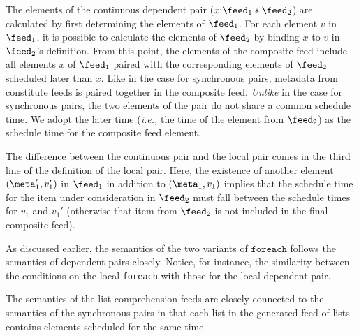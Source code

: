 The elements of the continuous dependent pair ($x{:}\feed_1 * \feed_2$)
are calculated by first determining the elements of $\feed_1$. 
For each element $v$ in $\feed_1$, it is possible to calculate
the elements of $\feed_2$ by binding $x$ to $v$ in $\feed_2$'s definition.
From this point, the elements of the composite feed include all elements
$x$ of $\feed_1$ paired with the corresponding elements of $\feed_2$ scheduled
later than $x$.  Like in the case for synchronous pairs, metadata from 
constitute feeds is paired together in the composite feed.  {\em Unlike}
in the case for synchronous pairs, the two elements of the pair do
not share a common schedule time.  We adopt the later time ({\em i.e.,}
the time of the element from $\feed_2$) as the schedule time for the
composite feed element.

The difference between the continuous pair and the local pair
comes in the third line of the definition of the local pair.
Here, the existence of another element $(\meta_1',v_1')$
in $\feed_1$ in addition to $(\meta_1,v_1)$ implies that the 
schedule time for the item under consideration in $\feed_2$
must fall between the schedule times for $v_1$ and $v_1'$
(otherwise that item from $\feed_2$ is not included in the
final composite feed). 

As discussed earlier, the semantics of the two variants of $\mathtt{foreach}$
follows the semantics of dependent pairs closely.  Notice, for instance,
the similarity between the conditions on the local {\tt foreach} with those
for the local dependent pair.  

The semantics of the list comprehension feeds are closely connected to the semantics of
the synchronous pairs in that each list in the generated feed of lists contains elements
scheduled for the same time.

